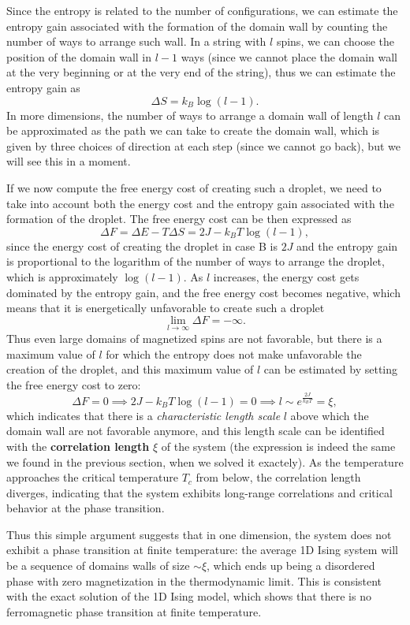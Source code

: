 \begin{remark}
  Since the entropy is related to the number of configurations, we can estimate the entropy gain associated with the formation of the domain wall by counting the number of ways to arrange such wall. In a string with \(l\) spins, we can choose the position of the domain wall in \(l-1\) ways (since we cannot place the domain wall at the very beginning or at the very end of the string), thus we can estimate the entropy gain as
  \[
    \Delta S = k_B \log(l-1).
  \]
  In more dimensions, the number of ways to arrange a domain wall of length \(l\) can be approximated as the path we can take to create the domain wall, which is given by three choices of direction at each step (since we cannot go back), but we will see this in a moment.
\end{remark}
If we now compute the free energy cost of creating such a droplet, we need to take into account both the energy cost and the entropy gain associated with the formation of the droplet. The free energy cost can be then expressed as
\[
  \Delta F = \Delta E - T \Delta S = 2 J - k_B T \log(l-1),
\]
since the energy cost of creating the droplet in case B is \(2 J\) and the entropy gain is proportional to the logarithm of the number of ways to arrange the droplet, which is approximately \(\log(l-1)\). As \(l\) increases, the energy cost gets dominated by the entropy gain, and the free energy cost becomes negative, which means that it is energetically unfavorable to create such a droplet
\[
  \lim_{l \to \infty} \Delta F = - \infty.
\]
Thus even large domains of magnetized spins are not favorable, but there is a maximum value of \(l\) for which the entropy does not make unfavorable the creation of the droplet, and this maximum value of \(l\) can be estimated by setting the free energy cost to zero:
\[
  \Delta F = 0 \implies 2 J - k_B T \log(l-1) = 0 \implies l \sim e^{\frac{2 J}{k_B T}} = \xi,
\]
which indicates that there is a \textit{characteristic length scale} \(l\) above which the domain wall are not favorable anymore, and this length scale can be identified with the \textbf{correlation length} \(\xi\) of the system (the expression is indeed the same we found in the previous section, when we solved it exactely). As the temperature approaches the critical temperature \(T_c\) from below, the correlation length diverges, indicating that the system exhibits long-range correlations and critical behavior at the phase transition.

Thus this simple argument suggests that in one dimension, the system does not exhibit a phase transition at finite temperature: the average 1D Ising system will be a sequence of domains walls of size \(\sim \xi\), which ends up being a disordered phase with zero magnetization in the thermodynamic limit. This is consistent with the exact solution of the 1D Ising model, which shows that there is no ferromagnetic phase transition at finite temperature.

